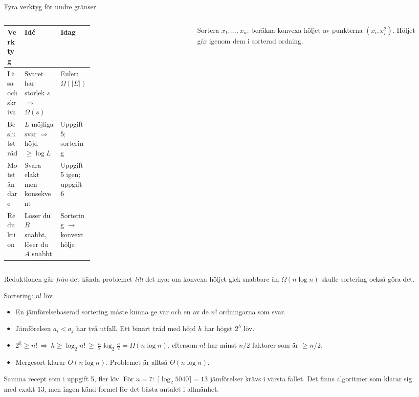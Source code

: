 \begin{frame}{Fyra verktyg för undre gränser}
\begin{columns}[T]
\begin{column}{0.68\textwidth}
\footnotesize
\renewcommand{\arraystretch}{1.35}
\begin{tabularx}{\linewidth}{@{}p{0.2\linewidth}Xp{0.27\linewidth}@{}}
\toprule
\textbf{Verktyg} & \textbf{Idé} & \textbf{Idag}\\
\midrule
Läsa och skriva & Svaret har storlek $s$ $\Rightarrow$ $\Omega(s)$ & Euler: $\Omega(|E|)$\\
Beslutsträd & $L$ möjliga svar $\Rightarrow$ höjd $\ge\log L$ & Uppgift 5; sortering\\
Motståndare & Svara elakt men konsekvent & Uppgift 5 igen; uppgift 6\\
Reduktion & Löser du $B$ snabbt, löser du $A$ snabbt & Sortering $\to$ konvext hölje\\
\bottomrule
\end{tabularx}
\end{column}
\begin{column}{0.29\textwidth}
\centering
\par
\scriptsize Sortera $x_1,\dots,x_n$: beräkna konvexa höljet av punkterna $(x_i,x_i^2)$. Höljet
går igenom dem i sorterad ordning.
\end{column}
\end{columns}
\vfill
\begin{ahabox}
Reduktionen går \emph{från} det kända problemet \emph{till} det nya: om konvexa höljet gick
snabbare än $\Omega(n\log n)$ skulle sortering också göra det.
\end{ahabox}
\end{frame}

{\kaninbg
\begin{frame}{\kh Sortering: $n!$ löv}
\small
\begin{itemize}\setlength{\itemsep}{3pt}
  \item En jämförelsebaserad sortering måste kunna ge var och en av de $n!$ ordningarna som svar.
  \item Jämförelsen $a_i<a_j$ har två utfall. Ett binärt träd med höjd $h$ har högst $2^h$ löv.
  \item $2^h\ge n!\ \Rightarrow\ h\ge\log_2 n!\ \ge\ \frac n2\log_2\frac n2=\Omega(n\log n)$,
        eftersom $n!$ har minst $n/2$ faktorer som är $\ge n/2$.
  \item Mergesort klarar $O(n\log n)$. Problemet är alltså $\Theta(n\log n)$.
\end{itemize}
\vfill
\begin{kaninbox}[fontupper=\footnotesize]
Samma recept som i uppgift 5, fler löv. För $n=7$: $\lceil\log_2 5040\rceil=13$ jämförelser
krävs i värsta fallet. Det finns algoritmer som klarar sig med exakt 13, men ingen känd
formel för det bästa antalet i allmänhet.
\end{kaninbox}
\end{frame}}


